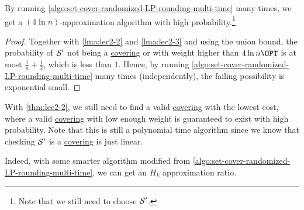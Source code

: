\begin{theorem}\label{thm:lec2-2}
	By running \autoref{algo:set-cover-randomized-LP-rounding-multi-time} many times, we get a \((4\ln n)\)-approximation algorithm with high probability.\footnote{Note that we still need to choose \(\mathcal{\MakeUppercase{S}}^\prime \).}
\end{theorem}
\begin{proof}
	Together with \autoref{lma:lec2-2} and \autoref{lma:lec2-3} and using the union bound, the probability of \(\mathcal{\MakeUppercase{S}} ^\prime \) not being a \hyperref[def:covering]{covering} or with weight higher than \(4\ln n\OPT\) is at most \(\frac{1}{n} + \frac{1}{2}\), which is less than \(1\). Hence, by running \autoref{algo:set-cover-randomized-LP-rounding-multi-time} many times (independently), the failing possibility is exponential small.
\end{proof}

\begin{note}
	With \autoref{thm:lec2-2}, we still need to find a valid \hyperref[def:covering]{covering} with the lowest cost, where a valid \hyperref[def:covering]{covering} with low enough weight is guaranteed to exist with high probability. Note that this is still a polynomial time algorithm since we know that checking \(\mathcal{\MakeUppercase{S}} ^\prime \) is a \hyperref[def:covering]{covering} is just linear.
\end{note}

\begin{remark}
	Indeed, with some smarter algorithm modified from \autoref{algo:set-cover-randomized-LP-rounding-multi-time}, we can get an \(H_k\) approximation ratio.
\end{remark}